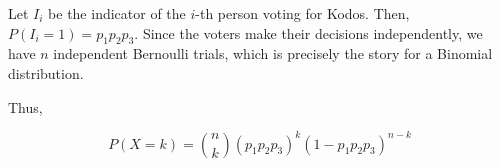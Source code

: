 Let $I_{i}$ be the indicator of the $i$-th person voting for Kodos.
Then, $P(I_{i}=1) = p_{1}p_{2}p_{3}.$ Since the voters make their decisions
independently, we have $n$ independent Bernoulli trials, which is precisely the
story for a Binomial distribution.

Thus,

$$P(X = k) = \binom{n}{k}(p_{1}p_{2}p_{3})^{k}(1- p_{1}p_{2}p_{3})^{n-k}$$